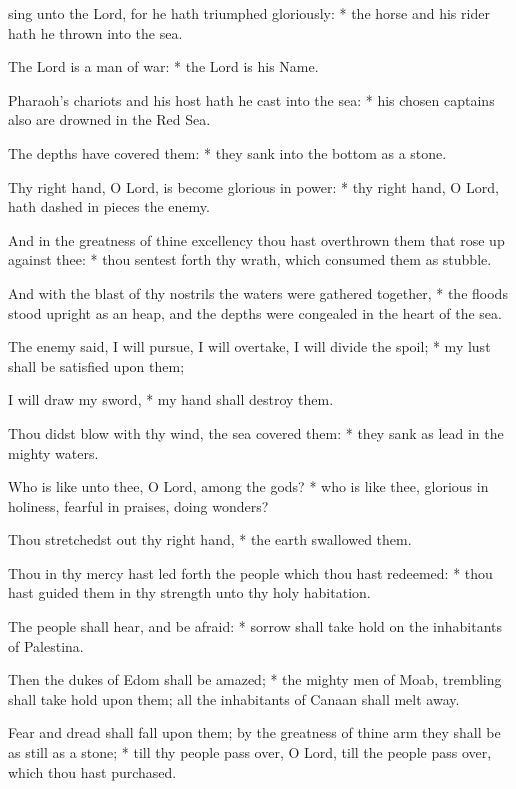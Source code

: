 \begin{multicols}{2}
 sing unto the Lord, for he hath triumphed gloriously: * the horse and his rider hath he thrown into the sea.\par
{}
The Lord is a man of war: * the Lord is his Name.\par
Pharaoh’s chariots and his host hath he cast into the sea: * his chosen captains also are drowned in the Red Sea.\par
The depths have covered them: * they sank into the bottom as a stone.\par
Thy right hand, O Lord, is become glorious in power: * thy right hand, O Lord, hath dashed in pieces the enemy.\par
And in the greatness of thine excellency {\dag} thou hast overthrown them that rose up against thee: * thou sentest forth thy wrath, which consumed them as stubble.\par
And with the blast of thy nostrils the waters were gathered together, * the floods stood upright as an heap, and the depths were congealed in the heart of the sea.\par
The enemy said, {\dag} I will pursue, I will overtake, I will divide the spoil; * my lust shall be satisfied upon them;\par
I will draw my sword, * my hand shall destroy them.\par
Thou didst blow with thy wind, the sea covered them: * they sank as lead in the mighty waters.\par
Who is like unto thee, O Lord, among the gods? * who is like thee, glorious in holiness, fearful in praises, doing wonders?\par
Thou stretchedst out thy right hand, * the earth swallowed them.\par
Thou in thy mercy hast led forth the people which thou hast redeemed: * thou hast guided them in thy strength unto thy holy habitation.\par
The people shall hear, and be afraid: * sorrow shall take hold on the inhabitants of Palestina.\par
Then the dukes of Edom shall be amazed; * the mighty men of Moab, trembling shall take hold upon them; all the inhabitants of Canaan shall melt away.\par
Fear and dread shall fall upon them; {\dag} by the greatness of thine arm they shall be as still as a stone; * till thy people pass over, O Lord, till the people pass over, which thou hast purchased.\par

\end{multicols}
